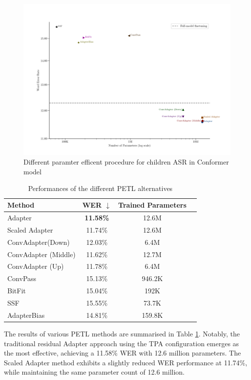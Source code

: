 \begin{figure}
    \begin{center}
        \includegraphics[width=\textwidth]{imgs/Adapter_compare_withoutWide.png}
        \caption{Different paramter efficent procedure for children ASR in Conformer model}
        \label{fig:adapter_compared_withoutWide}
    \end{center}
\end{figure}
\begin{table}
    \centering
    \begin{tabular}{lccc}
        \toprule
        \textbf{Method} & \textbf{WER $\downarrow$} & \textbf{Trained Parameters} \\
        \midrule
        Adapter & \textbf{11.58\%} & 12.6M \\
        Scaled Adapter & 11.74\% & 12.6M \\
        ConvAdapter(Down) & 12.03\% & 6.4M \\
        ConvAdapter (Middle) & 11.62\% & 12.7M \\
        ConvAdapter (Up) & 11.78\% & 6.4M \\
        ConvPass & 15.13\% & 946.2K \\
        BitFit & 15.04\% & 192K \\
        SSF & 15.55\% & 73.7K \\
        AdapterBias & 14.81\% & 159.8K \\
        \bottomrule
    \end{tabular}
    \caption{Performances of the different PETL alternatives}
    \label{tab:PETL_alternatives}
\end{table}
The results of various \ac{PETL} methods are summarised in Table \ref{tab:PETL_alternatives}. Notably, the traditional residual Adapter approach using the \ac{TPA} configuration emerges as the most effective, achieving a 11.58\% \ac{WER} with 12.6 million parameters. The Scaled Adapter method exhibits a slightly reduced \ac{WER} performance at 11.74\%, while maintaining the same parameter count of 12.6 million.

